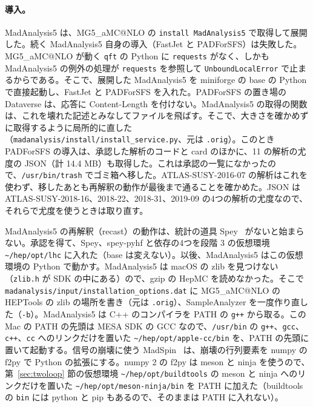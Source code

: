 \documentclass[a4paper,10pt]{ltjsarticle}
\makeatletter
\newcommand{\MGaMC}{MG5\_aMC@NLO}
\newcommand{\pth}[1]{\texttt{\textasciitilde/}\nolinkurl{#1}}
\makeatother
\begin{document}
\paragraph{導入。}MadAnalysis5 は、\MGaMC{} の \texttt{install MadAnalysis5} で取得して展開した。続く MadAnalysis5 自身の導入（FastJet と PADForSFS）は失敗した。\MGaMC{} が動く \texttt{qft} の Python に \texttt{requests} がなく、しかも MadAnalysis5 の例外の処理が \texttt{requests} を参照して \texttt{UnboundLocalError} で止まるからである。そこで、展開した MadAnalysis5 を miniforge の base の Python で直接起動し、FastJet と PADForSFS を入れた。PADForSFS の置き場の Dataverse は、応答に Content-Length を付けない。MadAnalysis5 の取得の関数は、これを壊れた記述とみなしてファイルを飛ばす。そこで、大きさを確かめずに取得するように局所的に直した（\texttt{madanalysis/install/install\_service.py}、元は \texttt{.orig}）。このとき PADForSFS の導入は、承認した解析のコードと card のほかに、11 の解析の尤度の JSON（計 14.4 MB）も取得した。これは承認の一覧になかったので、\texttt{/usr/bin/trash} でゴミ箱へ移した。ATLAS-SUSY-2016-07 の解析はこれを使わず、移したあとも再解釈の動作が最後まで通ることを確かめた。JSON は ATLAS-SUSY-2018-16、2018-22、2018-31、2019-09 の4つの解析の尤度なので、それらで尤度を使うときは取り直す。

MadAnalysis5 の再解釈（recast）の動作は、統計の道具 Spey~\cite{spey} がないと始まらない。承認を得て、Spey、spey-pyhf と依存の4つを段階 3 の仮想環境 \pth{hep/opt/lhc} に入れた（base は変えない）。以後、MadAnalysis5 はこの仮想環境の Python で動かす。MadAnalysis5 は macOS の zlib を見つけない（\texttt{zlib.h} が SDK の中にある）ので、gzip の HepMC を読めなかった。そこで \texttt{madanalysis/input/installation\_options.dat} に \MGaMC{} の HEPTools の zlib の場所を書き（元は \texttt{.orig}）、SampleAnalyzer を一度作り直した（\texttt{-b}）。MadAnalysis5 は C++ のコンパイラを PATH の \texttt{g++} から取る。この Mac の PATH の先頭は MESA SDK の GCC なので、\texttt{/usr/bin} の \texttt{g++}、\texttt{gcc}、\texttt{c++}、\texttt{cc} へのリンクだけを置いた \pth{hep/opt/apple-cc/bin} を、PATH の先頭に置いて起動する。信号の崩壊に使う MadSpin~\cite{madspin} は、崩壊の行列要素を numpy の f2py で Python の拡張にする。numpy 2 の f2py は meson と ninja を使うので、第~\ref{sec:twoloop} 節の仮想環境 \pth{hep/opt/buildtools} の meson と ninja へのリンクだけを置いた \pth{hep/opt/meson-ninja/bin} を PATH に加えた（buildtools の \texttt{bin} には python と pip もあるので、そのままは PATH に入れない）。
\end{document}
